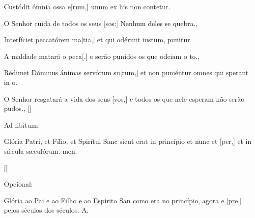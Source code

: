 {    {\item {}Custódit ómnia ossa e[rum,] unum ex his non contetur.}%
        {O Senhor cuida de todos os seus [sos:] Nenhum deles se quebra.},
    {\item {}Interfíciet peccatórem ma[tia,] et qui odérunt iustum, puni\-tur.}%
        {A maldade matará o peca[,] e serão punidos os que odeiam o to.},
    {\item {}Rédimet Dóminus ánimas servórum su[rum,] et non puniéntur omnes qui sperant in o.}%
        {O Senhor resgatará a vida dos seus [vos,] e todos os que nele esperam não serão pudos.},
    []{\begin{rubrica}Ad libítum:\end{rubrica} Glória Patri, et Fílio, et Spirítui Sanc sicut erat in princípio et nunc et [per,] et in sǽcula sæculórum. men.}%
        []{\begin{rubrica}Opcional:\end{rubrica} Glória ao Pai e ao Filho e ao Espírito San como era no princípio, agora e [pre,] pelos séculos dos séculos. A.}
}